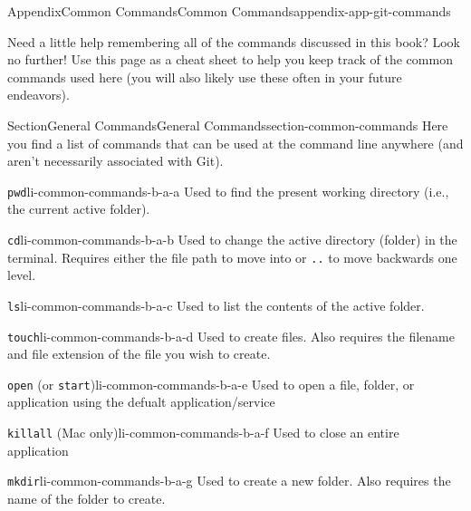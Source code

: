 \documentclass[twoside,10pt,]{book}
\newcommand{\mono}[1]{\texttt{#1}}
\begin{document}
\begin{appendixptx}{Appendix}{Common Commands}{}{Common Commands}{}{}{appendix-app-git-commands}
\renewcommand*{\appendixname}{Appendix}
\begin{introduction}{}%
Need a little help remembering all of the commands discussed in this book? Look no further! Use this page as a cheat sheet to help you keep track of the common commands used here (you will also likely use these often in your future endeavors).%
\end{introduction}%
%
%
\typeout{************************************************}
\typeout{************************************************}
%
\begin{sectionptx}{Section}{General Commands}{}{General Commands}{}{}{section-common-commands}
Here you find a list of commands that can be used at the command line anywhere (and aren't necessarily associated with Git).%
\begin{descriptionlist}
\begin{dlimedium}{\mono{pwd}}{li-common-commands-b-a-a}%
Used to find the present working directory (i.e.\@, the current active folder).%
\end{dlimedium}%
\begin{dlimedium}{\mono{cd}}{li-common-commands-b-a-b}%
Used to change the active directory (folder) in the terminal. Requires either the file path to move into or \mono{..} to move backwards one level.%
\end{dlimedium}%
\begin{dlimedium}{\mono{ls}}{li-common-commands-b-a-c}%
Used to list the contents of the active folder.%
\end{dlimedium}%
\begin{dlimedium}{\mono{touch}}{li-common-commands-b-a-d}%
Used to create files. Also requires the filename and file extension of the file you wish to create.%
\end{dlimedium}%
\begin{dlimedium}{\mono{open} (or \mono{start})}{li-common-commands-b-a-e}%
Used to open a file, folder, or application using the defualt application\slash{}service%
\end{dlimedium}%
\begin{dlimedium}{\mono{killall} (Mac only)}{li-common-commands-b-a-f}%
Used to close an entire application%
\end{dlimedium}%
\begin{dlimedium}{\mono{mkdir}}{li-common-commands-b-a-g}%
Used to create a new folder. Also requires the name of the folder to create.%

\end{dlimedium}
\end{descriptionlist}
\end{sectionptx}
\end{appendixptx}
\end{document}
